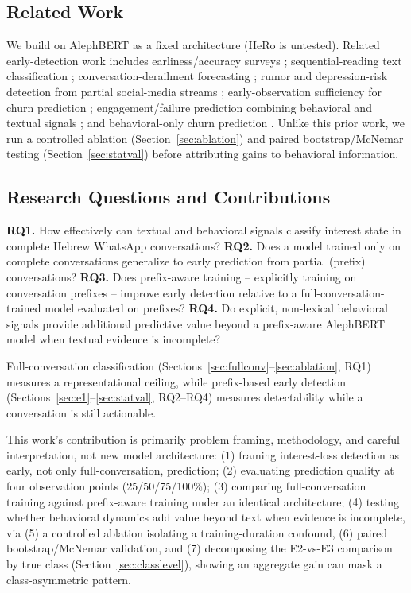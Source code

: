 \documentclass{article}
\begin{document}
\subsection{Related Work}
\label{sec:relwork}

We build on AlephBERT \citep{Seker2022} as a fixed architecture (HeRo \citep{Shalumov2023} is untested). Related early-detection work includes earliness/accuracy surveys \citep{Renault2024}; sequential-reading text classification \citep{DulacArnold2011}; conversation-derailment forecasting \citep{Chang2019}; rumor and depression-risk detection from partial social-media streams \citep{Song2019,Burdisso2019}; early-observation sufficiency for churn prediction \citep{Han2026}; engagement/failure prediction combining behavioral and textual signals \citep{Meng2021,Nourbakhsh2026}; and behavioral-only churn prediction \citep{Mufti2026}. Unlike this prior work, we run a controlled ablation (Section~\ref{sec:ablation}) and paired bootstrap/McNemar testing (Section~\ref{sec:statval}) before attributing gains to behavioral information.

\subsection{Research Questions and Contributions}
\label{sec:rq}

\noindent\textbf{RQ1.} How effectively can textual and behavioral signals classify interest state in complete Hebrew WhatsApp conversations? \textbf{RQ2.} Does a model trained only on complete conversations generalize to early prediction from partial (prefix) conversations? \textbf{RQ3.} Does prefix-aware training -- explicitly training on conversation prefixes -- improve early detection relative to a full-conversation-trained model evaluated on prefixes? \textbf{RQ4.} Do explicit, non-lexical behavioral signals provide additional predictive value beyond a prefix-aware AlephBERT model when textual evidence is incomplete?

Full-conversation classification (Sections~\ref{sec:fullconv}--\ref{sec:ablation}, RQ1) measures a representational ceiling, while prefix-based early detection (Sections~\ref{sec:e1}--\ref{sec:statval}, RQ2--RQ4) measures detectability while a conversation is still actionable.

This work's contribution is primarily problem framing, methodology, and careful interpretation, not new model architecture: (1) framing interest-loss detection as early, not only full-conversation, prediction; (2) evaluating prediction quality at four observation points (25/50/75/100\%); (3) comparing full-conversation training against prefix-aware training under an identical architecture; (4) testing whether behavioral dynamics add value beyond text when evidence is incomplete, via (5) a controlled ablation isolating a training-duration confound, (6) paired bootstrap/McNemar validation, and (7) decomposing the E2-vs-E3 comparison by true class (Section~\ref{sec:classlevel}), showing an aggregate gain can mask a class-asymmetric pattern.
\end{document}
